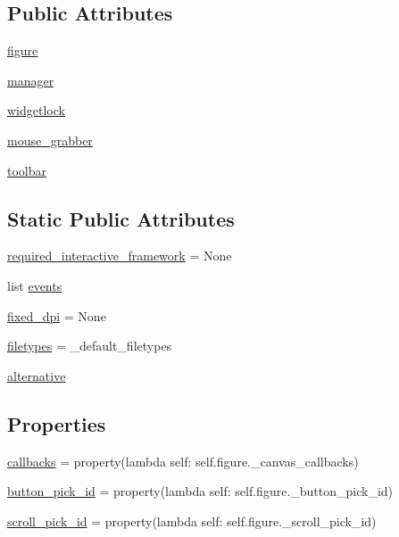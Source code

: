 \subsection*{Public Attributes}
\begin{DoxyCompactItemize}
\item 
\hyperlink{classmatplotlib_1_1backend__bases_1_1FigureCanvasBase_aa5120a3253575aac5d0e280f5debcff7}{figure}
\item 
\hyperlink{classmatplotlib_1_1backend__bases_1_1FigureCanvasBase_a58f3af7b4b580475f03845eab36ec896}{manager}
\item 
\hyperlink{classmatplotlib_1_1backend__bases_1_1FigureCanvasBase_af216464cb402371f96b8ae50a80c557e}{widgetlock}
\item 
\hyperlink{classmatplotlib_1_1backend__bases_1_1FigureCanvasBase_a67ef0b99c53c0fffafa7fa7be71cb1b9}{mouse\+\_\+grabber}
\item 
\hyperlink{classmatplotlib_1_1backend__bases_1_1FigureCanvasBase_a68e139cb2245a0b776f77f3e460cbfb2}{toolbar}
\end{DoxyCompactItemize}
\subsection*{Static Public Attributes}
\begin{DoxyCompactItemize}
\item 
\hyperlink{classmatplotlib_1_1backend__bases_1_1FigureCanvasBase_ab68e6cb12046ebb9a0fcc06cd0861dc4}{required\+\_\+interactive\+\_\+framework} = None
\item 
list \hyperlink{classmatplotlib_1_1backend__bases_1_1FigureCanvasBase_a82c4936e4f0a667d8891eb6585b87578}{events}
\item 
\hyperlink{classmatplotlib_1_1backend__bases_1_1FigureCanvasBase_a342527110740405c487c099f6603418d}{fixed\+\_\+dpi} = None
\item 
\hyperlink{classmatplotlib_1_1backend__bases_1_1FigureCanvasBase_a8de791646c22e4640b707f6e5e6ac4ba}{filetypes} = \+\_\+default\+\_\+filetypes
\item 
\hyperlink{classmatplotlib_1_1backend__bases_1_1FigureCanvasBase_a4d60d691efe79829ecbbe1aab9be7352}{alternative}
\end{DoxyCompactItemize}
\subsection*{Properties}
\begin{DoxyCompactItemize}
\item 
\hyperlink{classmatplotlib_1_1backend__bases_1_1FigureCanvasBase_a77f57c5506fc8cc335a756d19367cd82}{callbacks} = property(lambda self\+: self.\+figure.\+\_\+canvas\+\_\+callbacks)
\item 
\hyperlink{classmatplotlib_1_1backend__bases_1_1FigureCanvasBase_a4a750dfb3877cbfdd970cec78ae2a24f}{button\+\_\+pick\+\_\+id} = property(lambda self\+: self.\+figure.\+\_\+button\+\_\+pick\+\_\+id)
\item 
\hyperlink{classmatplotlib_1_1backend__bases_1_1FigureCanvasBase_a638e0276c2e4c0357ea446fd61fd8906}{scroll\+\_\+pick\+\_\+id} = property(lambda self\+: self.\+figure.\+\_\+scroll\+\_\+pick\+\_\+id)
\end{DoxyCompactItemize}


